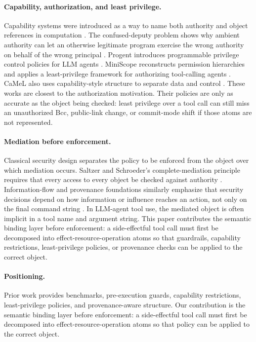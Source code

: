 \paragraph{Capability, authorization, and least privilege.}
Capability systems were introduced as a way to name both authority and object references in computation \cite{dennis1966programming}. The confused-deputy problem shows why ambient authority can let an otherwise legitimate program exercise the wrong authority on behalf of the wrong principal \cite{hardy1988confused}. Progent introduces programmable privilege control policies for LLM agents \cite{progent}. MiniScope reconstructs permission hierarchies and applies a least-privilege framework for authorizing tool-calling agents \cite{miniscope}. CaMeL also uses capability-style structure to separate data and control \cite{camel}. These works are closest to the authorization motivation. Their policies are only as accurate as the object being checked: least privilege over a tool call can still miss an unauthorized Bcc, public-link change, or commit-mode shift if those atoms are not represented.

\paragraph{Mediation before enforcement.}
Classical security design separates the policy to be enforced from the object over which mediation occurs. Saltzer and Schroeder's complete-mediation principle requires that every access to every object be checked against authority \cite{saltzer1975protection}. Information-flow and provenance foundations similarly emphasize that security decisions depend on how information or influence reaches an action, not only on the final command string \cite{denning1976lattice,buneman2001why,cheney2009provenance}. In LLM-agent tool use, the mediated object is often implicit in a tool name and argument string. This paper contributes the semantic binding layer before enforcement: a side-effectful tool call must first be decomposed into effect-resource-operation atoms so that guardrails, capability restrictions, least-privilege policies, or provenance checks can be applied to the correct object.

\paragraph{Positioning.}
Prior work provides benchmarks, pre-execution guards, capability restrictions, least-privilege policies, and provenance-aware structure. Our contribution is the semantic binding layer before enforcement: a side-effectful tool call must first be decomposed into effect-resource-operation atoms so that policy can be applied to the correct object.
